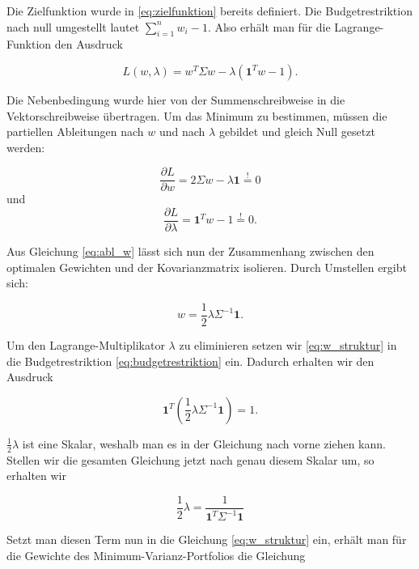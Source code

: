 \documentclass[parskip=half]{scrartcl}
\begin{document}
	Die Zielfunktion wurde in \eqref{eq:zielfunktion} bereits definiert. Die Budgetrestriktion nach null umgestellt lautet $\sum_{i=1}^{n} w_i - 1$. Also erhält man für die Lagrange-Funktion den Ausdruck
	
	\begin{equation*}
		L(w,\lambda) = w^T \Sigma w - \lambda (\mathbf{1}^T w-1) .
	\end{equation*}
	
	Die Nebenbedingung wurde hier von der Summenschreibweise in die Vektorschreibweise übertragen. Um das Minimum zu bestimmen, müssen die partiellen Ableitungen nach $w$ und nach $\lambda$ gebildet und gleich Null gesetzt werden:
	
	\begin{equation}
		\frac{\partial L}{\partial w} = 2 \Sigma w - \lambda \mathbf{1} \stackrel{!}{=} 0 \label{eq:abl_w}
	\end{equation}
	und
	\begin{equation}
		\frac{\partial L}{\partial \lambda} = \mathbf{1}^T w - 1 \stackrel{!}{=} 0. \label{eq:abl_lambda}
	\end{equation}
	
	Aus Gleichung \eqref{eq:abl_w} lässt sich nun der Zusammenhang zwischen den optimalen Gewichten und der Kovarianzmatrix isolieren. Durch Umstellen ergibt sich:
	
	\begin{equation}
		w = \frac{1}{2} \lambda \Sigma^{-1} \mathbf{1}. \label{eq:w_struktur}
	\end{equation}
	
	Um den Lagrange-Multiplikator $\lambda$ zu eliminieren setzen wir \eqref{eq:w_struktur} in die Budgetrestriktion \eqref{eq:budgetrestriktion} ein. Dadurch erhalten wir den Ausdruck
	
	\begin{equation*}
		\mathbf{1}^T \left(\frac{1}{2} \lambda \Sigma^{-1} \mathbf{1} \right) = 1.
	\end{equation*}
	
	$\frac{1}{2} \lambda$ ist eine Skalar, weshalb man es in der Gleichung nach vorne ziehen kann. Stellen wir die gesamten Gleichung jetzt nach genau diesem Skalar um, so erhalten wir
	
	\begin{equation*}
		\frac{1}{2} \lambda = \frac{1}{\mathbf{1}^T \Sigma^{-1} \mathbf{1}}
	\end{equation*}
	
	Setzt man diesen Term nun in die Gleichung \eqref{eq:w_struktur} ein, erhält man für die Gewichte des Minimum-Varianz-Portfolios die Gleichung
	
\end{document}
